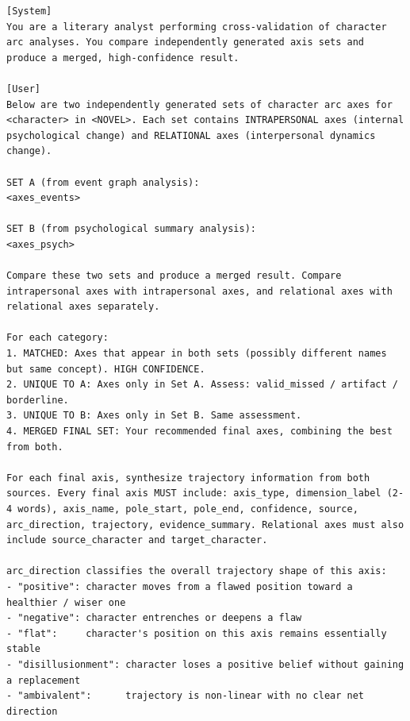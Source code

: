 \documentclass{llmxive}
\begin{document}
\begin{table}[htbp]
\centering
\begin{lstlisting}[basicstyle=\ttfamily\scriptsize]
[System]
You are a literary analyst performing cross-validation of character arc analyses. You compare independently generated axis sets and produce a merged, high-confidence result.

[User]
Below are two independently generated sets of character arc axes for <character> in <NOVEL>. Each set contains INTRAPERSONAL axes (internal psychological change) and RELATIONAL axes (interpersonal dynamics change).

SET A (from event graph analysis):
<axes_events>

SET B (from psychological summary analysis):
<axes_psych>

Compare these two sets and produce a merged result. Compare intrapersonal axes with intrapersonal axes, and relational axes with relational axes separately.

For each category:
1. MATCHED: Axes that appear in both sets (possibly different names but same concept). HIGH CONFIDENCE.
2. UNIQUE TO A: Axes only in Set A. Assess: valid_missed / artifact / borderline.
3. UNIQUE TO B: Axes only in Set B. Same assessment.
4. MERGED FINAL SET: Your recommended final axes, combining the best from both.

For each final axis, synthesize trajectory information from both sources. Every final axis MUST include: axis_type, dimension_label (2-4 words), axis_name, pole_start, pole_end, confidence, source, arc_direction, trajectory, evidence_summary. Relational axes must also include source_character and target_character.

arc_direction classifies the overall trajectory shape of this axis:
- "positive": character moves from a flawed position toward a healthier / wiser one
- "negative": character entrenches or deepens a flaw
- "flat":     character's position on this axis remains essentially stable
- "disillusionment": character loses a positive belief without gaining a replacement
- "ambivalent":      trajectory is non-linear with no clear net direction


\end{lstlisting}
\end{table}
\end{document}
